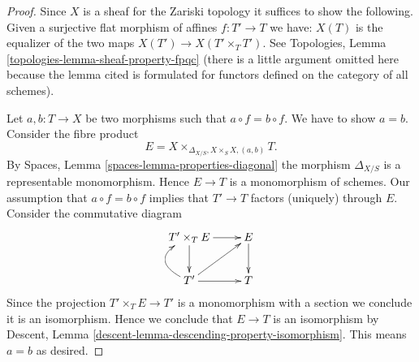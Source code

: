 \documentclass{stacks-project}
\theoremstyle{plain}
\theoremstyle{definition}
\theoremstyle{remark}
\numberwithin{equation}{subsection}
\begin{document}
\begin{proof}
Since $X$ is a sheaf for the Zariski topology it suffices to show
the following. Given a surjective flat morphism of affines
$f : T' \to T$ we have:
$X(T)$ is the equalizer of the two maps $X(T') \to X(T' \times_T T')$.
See Topologies, Lemma \ref{topologies-lemma-sheaf-property-fpqc}
(there is a little argument omitted here because the lemma cited
is formulated for functors defined on the category of all schemes).

\medskip\noindent
Let $a, b : T \to X$ be two morphisms such that $a \circ f = b \circ f$.
We have to show $a = b$. Consider the fibre product
$$
E = X \times_{\Delta_{X/S}, X \times_S X, (a, b)} T.
$$
By Spaces, Lemma \ref{spaces-lemma-properties-diagonal}
the morphism $\Delta_{X/S}$ is a representable monomorphism. Hence
$E \to T$ is a monomorphism of schemes. Our assumption that
$a \circ f = b \circ f$ implies that $T' \to T$ factors (uniquely) through $E$.
Consider the commutative diagram
$$
\xymatrix{
T' \times_T E \ar[r] \ar[d] & E \ar[d] \\
T' \ar[r] \ar@/^5ex/[u] \ar[ru] & T
}
$$
Since the projection $T' \times_T E \to T'$ is a monomorphism
with a section we conclude it is an isomorphism. Hence we conclude that
$E \to T$ is an isomorphism by
Descent, Lemma \ref{descent-lemma-descending-property-isomorphism}.
This means $a = b$ as desired.


\end{proof}
\end{document}
